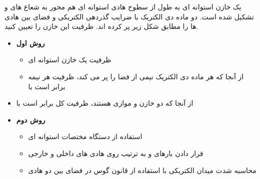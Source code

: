 \begin{ELexample}{}

یک خازن استوانه ای به طول  از سطوح هادی استوانه ای هم محور به شعاع های  و  تشکیل شده است. دو ماده دی الکتریک با ضرایب گذردهی الکتریکی  و  فضای بین هادی ها را مطابق شکل زیر پر کرده اند. ظرفیت این خازن را تعیین کنید.


\begin{ELsolution}

\begin{itemize}
\tightlist
\item
  \textbf{روش اول}

  \begin{itemize}
  \tightlist
  \item
    ظرفیت یک خازن استوانه ای \ELim{\ELto} 
  \item
    از آنجا که هر ماده دی الکتریک نیمی از فضا را پر می کند، ظرفیت هر نیمه برابر است با
  \end{itemize}
\end{itemize}


\begin{itemize}
\tightlist
\item
  از آنجا که دو خازن  و  موازی هستند، ظرفیت کل برابر است با
\end{itemize}


\begin{itemize}
\tightlist
\item
  \textbf{روش دوم}

  \begin{itemize}
  \tightlist
  \item
    استفاده از دستگاه مختصات استوانه ای
  \item
    قرار دادن بارهای  و  به ترتیب روی هادی های داخلی و خارجی
  \item
    محاسبه شدت میدان الکتریکی با استفاده از قانون گوس در فضای بین دو هادی
  \end{itemize}
\end{itemize}


\end{ELsolution}
\end{ELexample}
